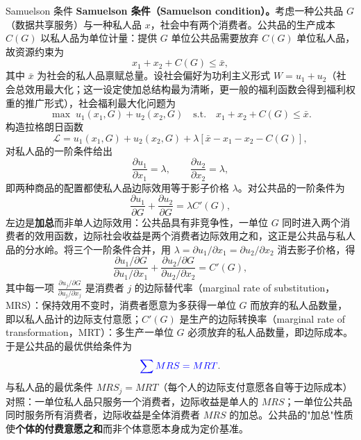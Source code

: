 \begin{derivation}{Samuelson 条件}{}
\textbf{Samuelson 条件（Samuelson condition）。}考虑一种公共品 $G$（数据共享服务）与一种私人品 $x$，社会中有两个消费者。公共品的生产成本 $C(G)$ 以私人品为单位计量：提供 $G$ 单位公共品需要放弃 $C(G)$ 单位私人品，故资源约束为
\[
x_1 + x_2 + C(G) \leq \bar x,
\]
其中 $\bar x$ 为社会的私人品禀赋总量。设社会偏好为功利主义形式 $W = u_1 + u_2$（社会总效用最大化；这一设定使加总结构最为清晰，更一般的福利函数会得到福利权重的推广形式），社会福利最大化问题为
\[
\max \; u_1(x_1, G) + u_2(x_2, G) \quad \text{s.t.} \quad x_1 + x_2 + C(G) \leq \bar x.
\]
构造拉格朗日函数
\[
\mathcal L = u_1(x_1, G) + u_2(x_2, G) + \lambda \left[ \bar x - x_1 - x_2 - C(G) \right],
\]
对私人品的一阶条件给出
\[
\frac{\partial u_1}{\partial x_1} = \lambda, \qquad \frac{\partial u_2}{\partial x_2} = \lambda,
\]
即两种商品的配置都使私人品边际效用等于影子价格 $\lambda$。对公共品的一阶条件为
\[
\frac{\partial u_1}{\partial G} + \frac{\partial u_2}{\partial G} = \lambda C'(G),
\]
左边是\textbf{加总}而非单人边际效用：公共品具有非竞争性，一单位 $G$ 同时进入两个消费者的效用函数，边际社会收益是两个消费者边际效用之和，这正是公共品与私人品的分水岭。将三个一阶条件合并，用 $\lambda = \partial u_1/\partial x_1 = \partial u_2/\partial x_2$ 消去影子价格，得
\[
\frac{\partial u_1/\partial G}{\partial u_1/\partial x_1} + \frac{\partial u_2/\partial G}{\partial u_2/\partial x_2} = C'(G),
\]
其中每一项 $\frac{\partial u_j/\partial G}{\partial u_j/\partial x_j}$ 是消费者 $j$ 的边际替代率（marginal rate of substitution，MRS）：保持效用不变时，消费者愿意为多获得一单位 $G$ 而放弃的私人品数量，即以私人品计的边际支付意愿；$C'(G)$ 是生产的边际转换率（marginal rate of transformation，MRT）：多生产一单位 $G$ 必须放弃的私人品数量，即边际成本。于是公共品的最优供给条件为
\[
{\color{blue} \sum MRS = MRT}.
\]
与私人品的最优条件 $MRS_j = MRT$（每个人的边际支付意愿各自等于边际成本）对照：一单位私人品只服务一个消费者，边际收益是单人的 $MRS$；一单位公共品同时服务所有消费者，边际收益是全体消费者 $MRS$ 的加总。公共品的"加总"性质使\textbf{个体的付费意愿之和}而非个体意愿本身成为定价基准。
\end{derivation}

